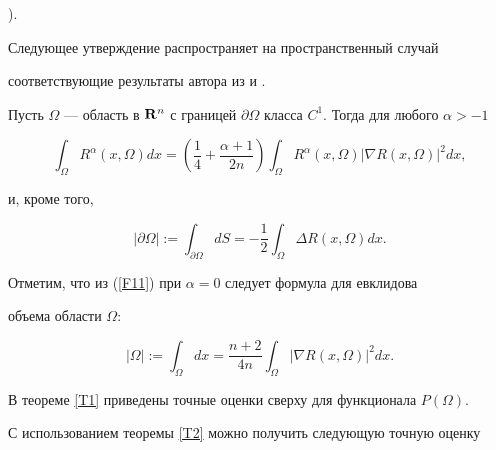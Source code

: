 \cite{l13}).





Следующее утверждение распространяет на пространственный случай 


соответствующие результаты автора из \cite{l3} и \cite{l4}.





\begin{thm} \label{T2}


Пусть $\Omega$ --- область в ${\bold R}^n$ с границей $\partial


\Omega$ класса $C^1$. Тогда для любого $\alpha >-1$


\begin{equation} \label{F11}


\int_\Omega R^\alpha (x,\Omega)dx=\left(


{\frac{1}{4}+\frac{\alpha +1}{2n}} \right)


\int_\Omega R^\alpha (x,\Omega)|\nabla R(x,\Omega)|^2dx,


\end{equation}


и, кроме того,


\begin{equation} \label{F12}


|\partial\Omega|:=\int_{\partial\Omega} dS=


-\frac{1}{2}\int_\Omega \Delta R(x,\Omega)dx.


\end{equation}


\end{thm}





Отметим, что из (\ref{F11}) при $\alpha =0$ следует формула для евклидова 


объема области $\Omega$:


\begin{equation} \label{F13}


|\Omega|:=\int_\Omega dx=\frac{n+2}{4n}\int_\Omega |\nabla R(x,\Omega)|^2dx.


\end{equation}





В теореме \ref{T1} приведены точные оценки сверху для функционала $P(\Omega)$.


С использованием теоремы \ref{T2} можно получить следующую точную оценку


